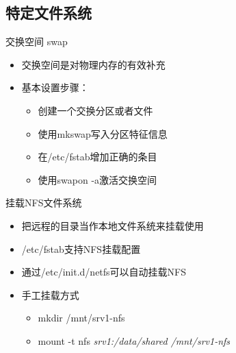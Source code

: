 \subsection{特定文件系统}

\begin{frame}{交换空间 swap}
\begin{itemize}
\item 交换空间是对物理内存的有效补充
\item 基本设置步骤：

\begin{itemize}
\item 创建一个交换分区或者文件
\item 使用mkswap写入分区特征信息
\item 在/etc/fstab增加正确的条目
\item 使用swapon -a激活交换空间
\end{itemize}
\end{itemize}

\end{frame} 
\begin{frame}{挂载NFS文件系统}
\begin{itemize}
\item 把远程的目录当作本地文件系统来挂载使用
\item /etc/fstab支持NFS挂载配置
\item 通过/etc/init.d/netfs可以自动挂载NFS
\item 手工挂载方式

\begin{itemize}
\item mkdir /mnt/srv1-nfs
\item mount -t nfs \emph{srv1:/data/shared /mnt/srv1-nfs}
\end{itemize}
\end{itemize}
\end{frame} 

